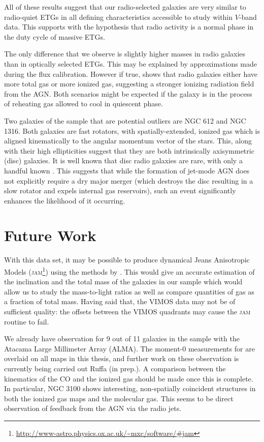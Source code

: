 All of these results suggest that our radio-selected galaxies are very similar to radio-quiet ETGs in all defining characteristics accessible to study within $V$-band data. This supports with the hypothesis that radio activity is a normal phase in the duty cycle of massive ETGs. 

The only difference that we observe is slightly higher  masses in radio galaxies than in optically selected ETGs. This may be explained by approximations made during the flux calibration. However if true, shows that radio galaxies either have more total gas or more ionized gas, suggesting a stronger ionizing radiation field from the AGN. Both scenarios might be expected if the galaxy is in the process of reheating gas allowed to cool in quiescent phase. 

Two galaxies of the sample that are potential outliers are NGC 612 and NGC 1316. Both galaxies are fast rotators, with spatially-extended, ionized gas which is aligned kinematically to the angular momentum vector of the stars. This, along with their high ellipticities suggest that they are both intrinsically axisymmetric (disc) galaxies. It is well known that disc radio galaxies are rare, with only a handful known \citep[e.g.][]{Heckman1982, Ledlow1998, Hota2011a, Morganti2011, Mao2015}. This suggests that while the formation of jet-mode AGN does not explicitly require a dry major merger (which destroys the disc resulting in a slow rotator and expels internal gas reservoirs), such an event significantly enhances the likelihood of it occurring. 

\section{Future Work}
	\label{sec:future}
	With this data set, it may be possible to produce dynamical Jeans Anisotropic Models (\textsc{jam}\footnote{\url{http://www-astro.physics.ox.ac.uk/~mxc/software/\#jam}}) using the methods by \citet{Cappellari2008}. This would give an accurate estimation of the inclination and the total mass of the galaxies in our sample which would allow us to study the mass-to-light ratios as well as compare quantities of gas as a fraction of total mass. Having said that, the VIMOS data may not be of sufficient quality: the offsets between the VIMOS quadrants may cause the \textsc{jam} routine to fail. 

	We already have observation for 9 out of 11 galaxies in the sample with the Atacama Large Millimeter Array (ALMA). The moment-0 measurements for  are overlaid on all maps in this thesis, and further work on these observation is currently being carried out Ruffa (in prep.). A comparison between the kinematics of the CO and the ionized gas should be made once this is complete. In particular, NGC 3100 shows interesting, non-spatially coincident structures in both the ionized gas maps and the molecular gas. This seems to be direct observation of feedback from the AGN via the radio jets. 

